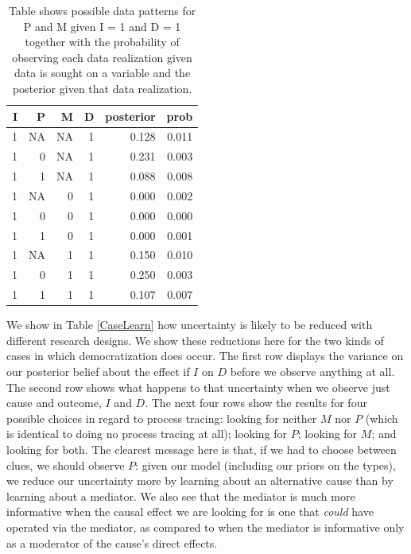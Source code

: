 \documentclass[12pt,]{book}
\begin{document}
\begin{table}[t]

\caption{\label{tab:unnamed-chunk-80}\label{possible_outcomes} Table shows possible data patterns for P and M given I = 1 and D = 1 together with the probability of observing each data realization given data is sought on a variable and the posterior given that data realization.}
\centering
\begin{tabular}{r|r|r|r|r|r}
\hline
I & P & M & D & posterior & prob\\
\hline
1 & NA & NA & 1 & 0.128 & 0.011\\
\hline
1 & 0 & NA & 1 & 0.231 & 0.003\\
\hline
1 & 1 & NA & 1 & 0.088 & 0.008\\
\hline
1 & NA & 0 & 1 & 0.000 & 0.002\\
\hline
1 & 0 & 0 & 1 & 0.000 & 0.000\\
\hline
1 & 1 & 0 & 1 & 0.000 & 0.001\\
\hline
1 & NA & 1 & 1 & 0.150 & 0.010\\
\hline
1 & 0 & 1 & 1 & 0.250 & 0.003\\
\hline
1 & 1 & 1 & 1 & 0.107 & 0.007\\
\hline
\end{tabular}
\end{table}

We show in Table \ref{CaseLearn} how uncertainty is likely to be reduced with different research designs. We show these reductions here for the two kinds of cases in which democratization does occur. The first row displays the variance on our posterior belief about the effect if \(I\) on \(D\) before we observe anything at all. The second row shows what happens to that uncertainty when we observe just cause and outcome, \(I\) and \(D\). The next four rows show the results for four possible choices in regard to process tracing: looking for neither \(M\) nor \(P\) (which is identical to doing no process tracing at all); looking for \(P\); looking for \(M\); and looking for both. The clearest message here is that, if we had to choose between clues, we should observe \(P\): given our model (including our priors on the types), we reduce our uncertainty more by learning about an alternative cause than by learning about a mediator. We also see that the mediator is much more informative when the causal effect we are looking for is one that \emph{could} have operated via the mediator, as compared to when the mediator is informative only as a moderator of the cause's direct effects.
\end{document}
